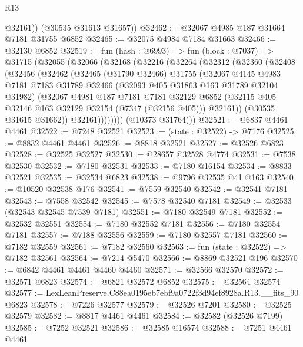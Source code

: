 \begin{lexlean}{R13}
\begin{coremodule}
          @32161))
      (@30535 @31613 @31657))
@32462 := @32067 @4985 @187 @31664 @7181 @31755 @6852
@32465 := @32075 @4984 @7184 @31663
@32466 := @32130 @6852
@32519 := fun (hash : @6993) =>
  fun (block : @7037) =>
  @31715
    (@32055
      (@32066
        (@32168
          (@32216
            (@32264
              (@32312
                (@32360
                  (@32408
                    (@32456
                      (@32462
                        (@32465
                          (@31790 @32466)
                          @31755
                          (@32067
                            @4145
                            @4983
                            @7181
                            @7183
                            @31789
                            @32466
                            (@32093 @405 @31863 @163 @31789 @32104 @31982)
                            (@32067
                              @4981
                              @187
                              @7181
                              @7181
                              @32129
                              @6852
                              (@32115 @405 @32146 @163 @32129 @32154 (@7347 (@32156 @405)))
                              @32161))
                          (@30535 @31615 @31662))
                        @32161))))))))
        (@10373 @31764)))
@32521 := @6837 @4461 @4461
@32522 := @7248 @32521
@32523 := (state : @32522) -> @7176
@32525 := @8832 @4461 @4461
@32526 := @8818 @32521
@32527 := @32526 @6823
@32528 := @32525 @32527
@32530 := @28657 @32528 @4774
@32531 := @7538 @32530
@32532 := @7180 @32531
@32533 := @7180 @16154
@32534 := @8833 @32521
@32535 := @32534 @6823
@32538 := @9796 @32535 @41 @163
@32540 := @10520 @32538 @176
@32541 := @7559 @32540
@32542 := @32541 @7181
@32543 := @7558 @32542
@32545 := @7578 @32540 @7181
@32549 := @32533 (@32543 @32545 @7539 @7181)
@32551 := @7180 @32549 @7181
@32552 := @32532 @32551
@32554 := @7180 @32552 @7181
@32556 := @7180 @32554 @7181
@32557 := @7188 @32556
@32559 := @7180 @32557 @7181
@32560 := @7182 @32559
@32561 := @7182 @32560
@32563 := fun (state : @32522) => @7182 @32561
@32564 := @7214 @5470
@32566 := @8869 @32521 @196
@32570 := @6842 @4461 @4461 @4460 @4460
@32571 := @32566 @32570
@32572 := @32571 @6823
@32574 := @6821 @32572 @6852
@32575 := @32564 @32574
@32577 := LexLeanPreserve.C88ea0195eb7ebf9a0722f3d94ef8928a.R13.__fits_90 @6823
@32578 := @7226 @32577
@32579 := @32526 @7201
@32580 := @32525 @32579
@32582 := @8817 @4461 @4461
@32584 := @32582 (@32526 @7199)
@32585 := @7252 @32521
@32586 := @32585 @16574
@32588 := @7251 @4461 @4461

\end{coremodule}
\end{lexlean}

